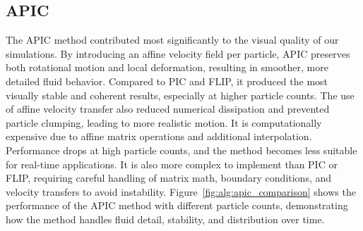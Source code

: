 \subsection{APIC}
The APIC method contributed most significantly to the visual quality of our simulations. By introducing an affine velocity field per particle, APIC preserves both rotational motion and local deformation, resulting in smoother, more detailed fluid behavior. Compared to PIC and FLIP, it produced the most visually stable and coherent results, especially at higher particle counts. The use of affine velocity transfer also reduced numerical dissipation and prevented particle clumping, leading to more realistic motion.
It is computationally expensive due to affine matrix operations and additional interpolation. Performance drops at high particle counts, and the method becomes less suitable for real-time applications. It is also more complex to implement than PIC or FLIP, requiring careful handling of matrix math, boundary conditions, and velocity transfers to avoid instability.
Figure~\ref{fig:alg:apic_comparison} shows the performance of the APIC method with different particle counts, demonstrating how the method handles fluid detail, stability, and distribution over time.

